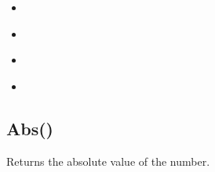 \documentclass[letterpaper,10pt,english]{sphinxmanual}
\begin{document}
\begin{sphinxShadowBox}
\begin{itemize}
\item {} 
\sphinxAtStartPar
{}\label{\detokenize{reference/peblmath:id34}}{\hyperref[\detokenize{reference/peblmath:tofloat}]{}}

\item {} 
\sphinxAtStartPar
{}\label{\detokenize{reference/peblmath:id35}}{\hyperref[\detokenize{reference/peblmath:tointeger}]{}}

\item {} 
\sphinxAtStartPar
{}\label{\detokenize{reference/peblmath:id36}}{\hyperref[\detokenize{reference/peblmath:tonumber}]{}}

\item {} 
\sphinxAtStartPar
{}\label{\detokenize{reference/peblmath:id37}}{\hyperref[\detokenize{reference/peblmath:tostring}]{}}

\end{itemize}
\end{sphinxShadowBox}


\subsection{Abs()}
\label{\detokenize{reference/peblmath:abs}}
\sphinxAtStartPar
{}

\sphinxAtStartPar
{}

\sphinxAtStartPar
Returns the absolute value of the number.

\sphinxAtStartPar
{}

\begin{sphinxVerbatim}[commandchars=\\\{\}]
\end{sphinxVerbatim}

\sphinxAtStartPar
{}

\begin{sphinxVerbatim}[commandchars=\\\{\}]
\end{sphinxVerbatim}
\end{document}
